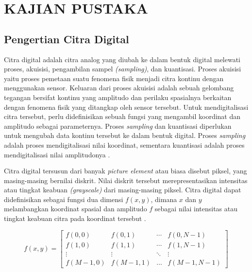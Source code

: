 
\chapter{KAJIAN PUSTAKA}
  
\section{Pengertian Citra Digital}
    Citra digital adalah citra analog yang diubah ke dalam bentuk digital melewati proses, akuisisi,  pengambilan sampel \textit{(sampling)}, dan kuantisasi. Proses akuisisi yaitu proses pemetaan suatu fenomena fisik menjadi citra kontinu dengan menggunakan sensor. Keluaran dari proses akuisisi adalah sebuah gelombang tegangan bersifat kontinu yang amplitudo dan perilaku spasialnya berkaitan dengan fenomena fisik yang ditangkap oleh sensor tersebut. Untuk mendigitalisasi citra tersebut, perlu didefinisikan sebuah fungsi yang mengambil koordinat dan amplitudo sebagai parameternya. Proses \textit{sampling} dan kuantisasi diperlukan untuk mengubah data kontinu tersebut ke dalam bentuk digital. Proses \textit{sampling} adalah proses mendigitalisasi nilai koordinat, sementara kuantisasi adalah proses mendigitalisasi nilai amplitudonya \citep{Gonzalez2018}.
    
    Citra digital tersusun dari banyak \textit{picture element} atau biasa disebut piksel, yang masing-masing bernilai diskrit. Nilai diskrit tersebut merepresentasikan intensitas atau tingkat keabuan \textit{(grayscale)} dari masing-masing piksel. Citra digital dapat didefinisikan sebagai fungsi dua dimensi $f(x, y)$, dimana $x$ dan $y$ melambangkan koordinat spasial dan amplitudo $f$ sebagai nilai intensitas atau tingkat keabuan citra pada koordinat tersebut \citep{Gonzalez2018}.
    
    \begin{equation}\label{eq:2.1}
        f(x, y) = 
        \begin{bmatrix}
        f(0, 0) & f(0, 1) & \cdots & f(0, N - 1)\\
        f(1, 0) & f(1, 1) & \cdots & f(1, N - 1)\\
        \vdots & \vdots & \ddots & \vdots \\
        f(M - 1, 0) & f(M - 1, 1) & ... & f(M - 1, N -1)
        \end{bmatrix}
    \end{equation}
    

